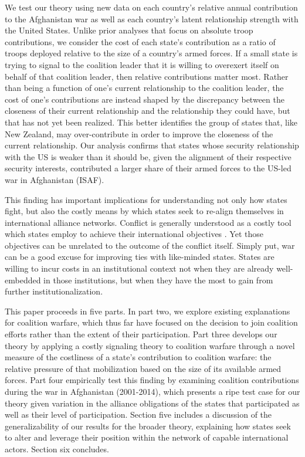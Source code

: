 \documentclass[12pt,letterpaper]{article}
\begin{document}
	We test our theory using new data on each country's relative annual contribution to the Afghanistan war as well as each country's latent relationship strength with the United States. Unlike prior analyses that focus on absolute troop contributions, we consider the cost of each state's contribution as a ratio of troops deployed relative to the size of a country's armed forces. If a small state is trying to signal to the coalition leader that it is willing to overexert itself on behalf of that coalition leader, then relative contributions matter most. Rather than being a function of one's current relationship to the coalition leader, the cost of one's contributions are instead shaped by the discrepancy between the closeness of their current relationship and the relationship they could have, but that has not yet been realized. This better identifies the group of states that, like New Zealand, may over-contribute in order to improve the closeness of the current relationship. Our analysis confirms that states whose security relationship with the US is weaker than it should be, given the alignment of their respective security interests, contributed a larger share of their armed forces to the US-led war in Afghanistan (ISAF).
	
	This finding has important implications for understanding not only how states fight, but also the costly means by which states seek to re-align themselves in international alliance networks. Conflict is generally understood as a costly tool which states employ to achieve their international objectives \citep{betts_shouldstrategicstudies_1997}. Yet those objectives can be unrelated to the outcome of the conflict itself. Simply put, war can be a good excuse for improving ties with like-minded states. States are willing to incur costs in an institutional context not when they are already well-embedded in those institutions, but when they have the most to gain from further institutionalization.

	This paper proceeds in five parts. In part two, we explore existing explanations for coalition warfare, which thus far have focused on the decision to join coalition efforts rather than the extent of their participation. Part three develops our theory by applying a costly signaling theory to coalition warfare through a novel measure of the costliness of a state's contribution to coalition warfare: the relative pressure of that mobilization based on the size of its available armed forces. Part four empirically test this finding by examining coalition contributions during the war in Afghanistan (2001-2014), which presents a ripe test case for our theory given variation in the alliance obligations of the states that participated as well as their level of participation. Section five includes a discussion of the generalizability of our results for the broader theory, explaining how states seek to alter and leverage their position within the network of capable international actors. Section six concludes.
\end{document}
